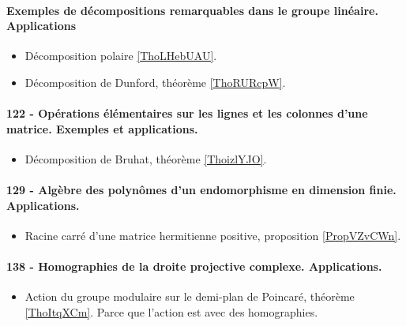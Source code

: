 \paragraph{Exemples de décompositions remarquables dans le groupe linéaire. Applications}
\begin{itemize}
    \item Décomposition polaire \ref{ThoLHebUAU}.
    \item Décomposition de Dunford, théorème \ref{ThoRURcpW}. 
\end{itemize}

\paragraph{122 - Opérations élémentaires sur les lignes et les colonnes d’une matrice. Exemples et applications.}
\begin{itemize}
    \item Décomposition de Bruhat, théorème \ref{ThoizlYJO}.
\end{itemize}
\paragraph{129 - Algèbre des polynômes d'un endomorphisme en dimension finie. Applications.}
\begin{itemize}
    \item Racine carré d'une matrice hermitienne positive, proposition \ref{PropVZvCWn}.
\end{itemize}
\paragraph{138 - Homographies de la droite projective complexe. Applications.}
\begin{itemize}
    \item Action du groupe modulaire sur le demi-plan de Poincaré, théorème \ref{ThoItqXCm}. Parce que l'action est avec des homographies.
\end{itemize}
